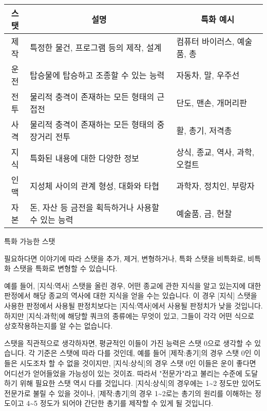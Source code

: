\documentclass{report}
\begin{document}
\begin{minipage}{\textwidth}
		\begin{tabularx}{\textwidth}{c|X|l}
			\hline
			\textbf{스탯} & \multicolumn{1}{c|}{\textbf{설명}} & \multicolumn{1}{c}{\textbf{특화 예시}} \\ \hline \hline
			제작          & 특정한 물건, 프로그램 등의 제작, 설계          & 컴퓨터 바이러스, 예술품, 총          \\\hline
			운전          & 탑승물에 탑승하고 조종할 수 있는 능력           & 자동차, 말, 우주선         \\\hline
			전투          & 물리적 충격이 존재하는 모든 형태의 근접전         & 단도, 맨손, 개머리판         \\\hline
			사격          & 물리적 충격이 존재하는 모든 형태의 중장거리 전투     & 활, 총기, 저격총         \\\hline
			지식          & 특화된 내용에 대한 다양한 정보               & 상식, 종교, 역사, 과학, 오컬트         \\\hline
			인맥          & 지성체 사이의 관계 형성, 대화와 타협           & 과학자, 정치인, 부랑자         \\\hline
			자본          & 돈, 자산 등 금전을 획득하거나 사용할 수 있는 능력   & 예술품, 금, 현찰  \\\hline
		\end{tabularx}
		
		\smallskip
		
		\begin{tightcenter}
			특화 가능한 스탯
		\end{tightcenter}
	\end{minipage}
	
	\bigskip
	
	필요하다면 이야기에 따라 스탯을 추가, 제거, 변형하거나, 특화 스탯을 비특화로, 비특화 스탯을 특화로 변형할 수 있습니다.
	
	\bigskip
	
	예를 들어, [지식:역사] 스탯을 올린 경우, 어떤 종교에 관한 지식을 알고 있는지에 대한 판정에서 해당 종교의 역사에 대한 지식을 얻을 수는 있습니다. 이 경우 [지식] 스탯을 사용한 판정에서 사용될 판정치보다는 [지식:역사]에서 사용될 판정치가 낮을 것입니다. 하지만 [지식:과학]에 해당할 쿼크의 종류에는 무엇이 있고, 그들이 각각 어떤 식으로 상호작용하는지를 알 수는 없습니다.
	
	\bigskip
	
	스탯을 직관적으로 생각하자면, 평균적인 이들이 가진 능력은 스탯 0으로 생각할 수 있습니다. 각 기준은 스탯에 따라 다를 것인데, 예를 들어 [제작:총기]의 경우 스탯 0인 이들은 시도조차 할 수 없을 것이지만, [지식:상식]의 경우 스탯 0인 이들은 운이 좋다면 어디선가 얻어들었을 가능성이 있는 것이죠. 따라서 "전문가"라고 불리는 수준에 도달하기 위해 필요한 스탯 역시 다를 것입니다. [지식:상식]의 경우에는 1\textasciitilde2 정도만 있어도 전문가로 불릴 수 있을 것이나, [제작:총기]의 경우 1\textasciitilde2로는 총기의 원리를 이해하는 정도이고 4\textasciitilde5 정도가 되어야 간단한 총기를 제작할 수 있게 될 것입니다.
	
\end{document}
